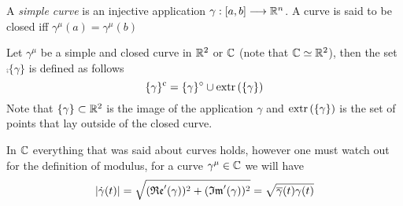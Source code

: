 \documentclass[../complete.tex]{subfiles}
\begin{document}
\begin{dfn}
	A \textit{simple curve} is an injective application $\gamma:[a,b]\overset{}{\longrightarrow}\mathbb{R}^n$. A curve is said to be closed iff $\gamma^\mu(a)=\gamma^\mu(b)$
\end{dfn}
\begin{thm}
	Let $\gamma^\mu$ be a simple and closed curve in $\mathbb{R}^2$ or $\mathbb{C}$ (note that $\mathbb{C}\simeq\mathbb{R}^2$), then the set $\comp{\{\gamma\}}$ is defined as follows
	\begin{equation}
		\{\gamma\}^{\mathrm{c}}=\{\gamma\}^{\circ}\cup\operatorname{extr}{(\{\gamma\})}
		\label{eq:jordanthm}
	\end{equation}
	Note that $\{\gamma\}\subset\mathbb{R}^2$ is the image of the application $\gamma$ and $\operatorname{extr}{(\{\gamma\})}$ is the set of points that lay outside of the closed curve.
\end{thm}
In $\mathbb{C}$ everything that was said about curves holds, however one must watch out for the definition of modulus, for a curve $\gamma^\mu\in\mathbb{C}$ we will have
\begin{equation}
	\abs{\dot{\gamma}(t)}=\sqrt{(\mathfrak{Re}'(\gamma))^2+(\mathfrak{Im}'(\gamma))^2}=\sqrt{\overline{\gamma}(t)\gamma(t)}
	\label{eq:abscfgamma}
\end{equation}
\end{document}
